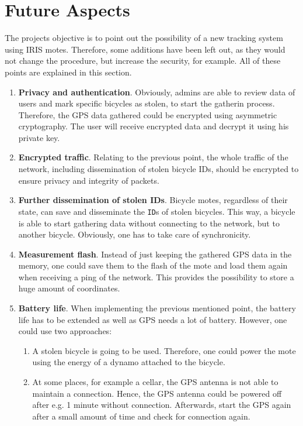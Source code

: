 \documentclass[a4paper]{article}
\begin{document}
\section{Future Aspects}
The projects objective is to point out the possibility of a new tracking system using IRIS motes. Therefore, some additions have been left out, as they would not change the procedure, but increase the security, for example. All of these points are explained in this section.
\begin{enumerate}
\item \textbf{Privacy and authentication}. Obviously, admins are able to review data of users and mark specific bicycles as stolen, to start the gatherin process. Therefore, the GPS data gathered could be encrypted using asymmetric cryptography. The user will receive encrypted data and decrypt it using his private key.
\item \textbf{Encrypted traffic}. Relating to the previous point, the whole traffic of the network, including dissemination of stolen bicycle IDs, should be encrypted to ensure privacy and integrity of packets.
\item \textbf{Further dissemination of stolen IDs}. Bicycle motes, regardless of their state, can save and disseminate the \texttt{ID}s of stolen bicycles. This way, a bicycle is able to start gathering data without connecting to the network, but to another bicycle. Obviously, one has to take care of synchronicity.
\item \textbf{Measurement flash}. Instead of just keeping the gathered GPS data in the memory, one could save them to the flash of the mote and load them again when receiving a ping of the network. This provides the possibility to store a huge amount of coordinates.
\item \textbf{Battery life}. When implementing the previous mentioned point, the battery life has to be extended as well as GPS needs a lot of battery. However, one could use two approaches:
\begin{enumerate}
\item A stolen bicycle is going to be used. Therefore, one could power the mote using the energy of a dynamo attached to the bicycle.
\item At some places, for example a cellar, the GPS antenna is not able to maintain a connection. Hence, the GPS antenna could be powered off after e.g. 1 minute without connection. Afterwards, start the GPS again after a small amount of time and check for connection again.
\end{enumerate}

\end{enumerate}
\end{document}
